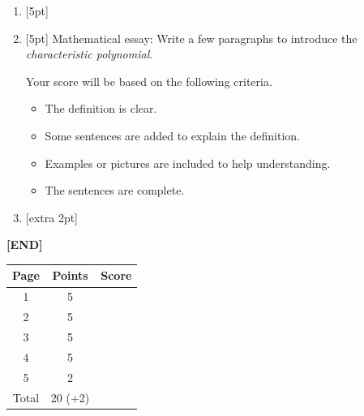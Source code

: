 \documentclass[a4paper]{article}
\begin{document}
\begin{Large}
\begin{enumerate}
\item{} [5pt]
\newpage

\item{} [5pt] Mathematical essay:  Write a few paragraphs to introduce the \emph{characteristic polynomial}.

Your score will be based on the following criteria.  
\begin{itemize}
\item The definition is clear.
\item Some sentences are added to explain the definition.
\item Examples or pictures are included to help understanding.
\item The sentences are complete.
\end{itemize}
\newpage


\item{} [extra 2pt] 


\end{enumerate}
\vfill
\hfill \textbf{[END]}

\newpage
\thispagestyle{empty}
\rule{0pt}{0pt}
\vfil
\begin{center}
\begin{tabular}{|c|c|c|}
\hline
Page & Points & Score \\
\hline
1 & 5 &  \\ 
\hline
2 & 5 &  \\ 
\hline
3 & 5 &  \\ 
\hline
4 & 5 &  \\ 
\hline
5 & 2 &  \\ 
\hline
Total & 20 (+2) &  \\
\hline
\end{tabular}
\end{center}
\end{Large}
\end{document}
